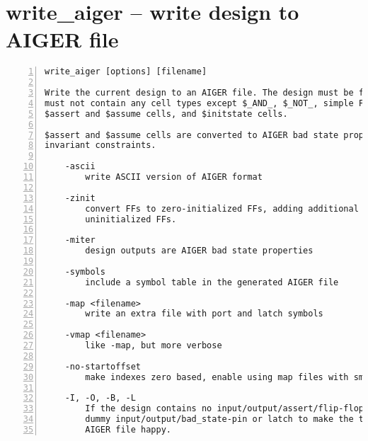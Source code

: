 \section{write\_aiger -- write design to AIGER file}
\label{cmd:write_aiger}
\begin{lstlisting}[numbers=left,frame=single]
    write_aiger [options] [filename]

Write the current design to an AIGER file. The design must be flattened and
must not contain any cell types except $_AND_, $_NOT_, simple FF types,
$assert and $assume cells, and $initstate cells.

$assert and $assume cells are converted to AIGER bad state properties and
invariant constraints.

    -ascii
        write ASCII version of AIGER format

    -zinit
        convert FFs to zero-initialized FFs, adding additional inputs for
        uninitialized FFs.

    -miter
        design outputs are AIGER bad state properties

    -symbols
        include a symbol table in the generated AIGER file

    -map <filename>
        write an extra file with port and latch symbols

    -vmap <filename>
        like -map, but more verbose

    -no-startoffset
        make indexes zero based, enable using map files with smt solvers.

    -I, -O, -B, -L
        If the design contains no input/output/assert/flip-flop then create one
        dummy input/output/bad_state-pin or latch to make the tools reading the
        AIGER file happy.
\end{lstlisting}

